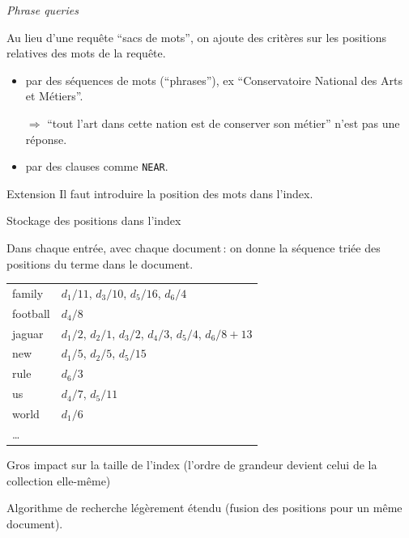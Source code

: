 \begin{frame}{\textit{Phrase queries}}

Au lieu d'une requête ``sacs de mots'', on ajoute des critères sur les \alert{positions
relatives} des mots de la requête.

\begin{itemize}
  \item par des séquences de mots (``phrases''), ex ``Conservatoire National des Arts et Métiers''.
  
     $\Rightarrow$ ``tout l'art dans cette nation est de conserver son métier'' n'est pas une réponse.
     
  \item par des clauses comme \texttt{NEAR}. 
\end{itemize}

\begin{block}{Extension}
Il faut introduire la \alert{position des mots} dans l'index.
\end{block}

\end{frame}

\begin{frame}{Stockage des positions dans l'index}

Dans chaque entrée, avec chaque document\,: on donne la séquence \alert{triée} des
positions du terme dans le document.

\smallskip

\begin{tabular}{>{\color{structure.fg}}ll}
family&$d_1/11$, $d_3/10$, $d_5/16$, $d_6/4$\\
football&$d_4/8$\\
jaguar&$d_1/2$, $d_2/1$, $d_3/2$, $d_4/3$, $d_5/4$, $d_6/8+13$\\
new&$d_1/5$, $d_2/5$, $d_5/15$\\
rule&$d_6/3$\\
us&$d_4/7$, $d_5/11$\\
world&$d_1/6$\\
\ldots
\end{tabular}

\smallskip

Gros impact sur la \alert{taille} de l'index (l'ordre de grandeur devient celui de la collection elle-même)

\smallskip

Algorithme de recherche légèrement étendu (fusion des positions pour un même document).
\end{frame}


